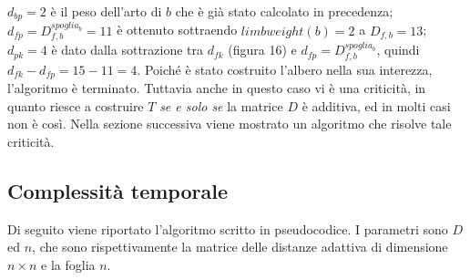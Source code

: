 \newline
$d_{bp}=2$ è il peso dell'arto di $b$ che è già stato calcolato in precedenza; $d_{fp}=D^{spoglia_{b}}_{f,b}=11$ è ottenuto sottraendo $limbweight(b)=2$ a $D_{f,b}=13$; $d_{pk}=4$ è dato dalla sottrazione tra $d_{fk}$ (figura 16) e $d_{fp}=D^{spoglia_{b}}_{f,b}$, quindi $d_{fk}-d_{fp}=15-11=4$.
\newline
Poiché è stato costruito l'albero nella sua interezza, l'algoritmo è terminato. Tuttavia anche in questo caso vi è una criticità, in quanto riesce a costruire $T$ \textit{se e solo se} la matrice $D$ è additiva, ed in molti casi non è così.
\newline
Nella sezione successiva viene mostrato un algoritmo che risolve tale criticità.

\newpage
\subsection{Complessità temporale}
Di seguito viene riportato l'algoritmo scritto in pseudocodice. I parametri sono $D$ ed $n$, che sono rispettivamente la matrice delle distanze adattiva di dimensione $n \times n$ e la foglia $n$.

